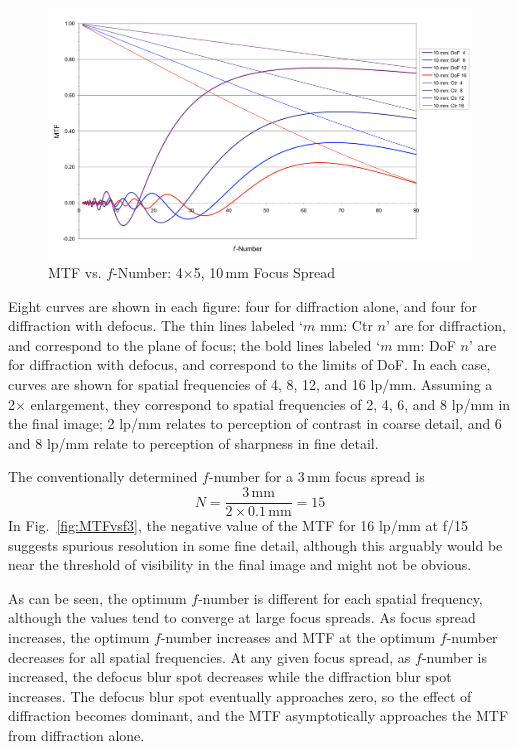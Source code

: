 \documentclass[11pt, oneside]{scrartcl}   	%
\begin{document}
\begin{figure}[htbp] %
   \centering
   \includegraphics[width=\linewidth]{figure/fig_dofd_12} 
   \caption{MTF vs. $f$-Number: 4×5, 10\,mm Focus Spread}
   \label{fig:MTFvsf10}
\end{figure}
Eight curves are shown in each figure: four for diffraction alone, and four for diffraction with defocus. The thin lines labeled ‘$m$ mm: Ctr $n$’ are for diffraction, and correspond to the plane of focus; the bold lines labeled ‘$m$ mm: DoF $n$’ are for diffraction with defocus, and correspond to the limits of DoF. In each case, curves are shown for spatial frequencies of 4, 8, 12, and 16 lp/mm. Assuming a 2× enlargement, they correspond to spatial frequencies of 2, 4, 6, and 8 lp/mm in the final image; 2 lp/mm relates to perception of contrast in coarse detail, and 6 and 8 lp/mm relate to perception of sharpness in fine detail.

The conventionally determined $f$-number for a 3\,mm focus spread is 
\begin{equation}
N = \frac{3\,\mathrm{mm}}{2\times 0.1\,\mathrm{mm}} = 15
\end{equation}
In Fig.~\ref{fig:MTFvsf3}, the negative value of the MTF for 16 lp/mm at f/15 suggests spurious resolution in some fine detail, although this arguably would be near the threshold of visibility in the final image and might not be obvious.

As can be seen, the optimum $f$-number is different for each spatial frequency, although the values tend to converge at large focus spreads. As focus spread increases, the optimum $f$-number increases and MTF at the optimum $f$-number decreases for all spatial frequencies. At any given focus spread, as $f$-number is increased, the defocus blur spot decreases while the diffraction blur spot increases. The defocus blur spot eventually approaches zero, so the effect of diffraction becomes dominant, and the MTF asymptotically approaches the MTF from diffraction alone.
\end{document}
